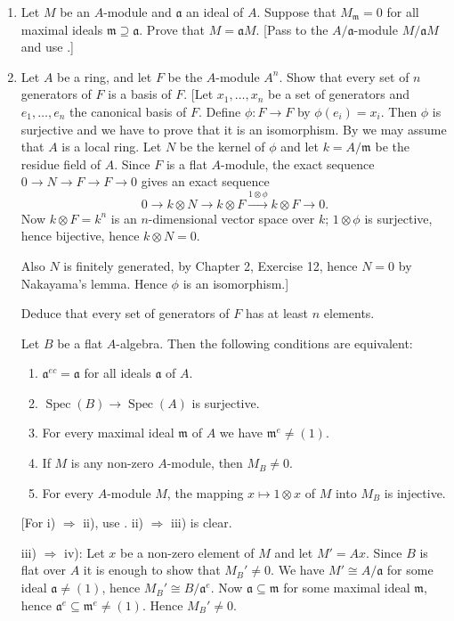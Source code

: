 \begin{enumerate}
\item Let $M$ be an $A$-module and $\mathfrak a$ an ideal of $A$. Suppose that $M_{\mathfrak m}=0$ for all maximal ideals $\mathfrak m\supseteq\mathfrak a$. Prove that $M=\mathfrak aM$. [Pass to the $A/\mathfrak a$-module $M/\mathfrak aM$ and use .]

\item Let $A$ be a ring, and let $F$ be the $A$-module $A^n$. Show that every set of $n$ generators of $F$ is a basis of $F$. [Let $x_1,\ldots,x_n$ be a set of generators and $e_1,\ldots,e_n$ the canonical basis of $F$. Define $\phi:F\longrightarrow F$ by $\phi(e_i)=x_i$. Then $\phi$ is surjective and we have to prove that it is an isomorphism. By  we may assume that $A$ is a local ring. Let $N$ be the kernel of $\phi$ and let $k=A/\mathfrak m$ be the residue field of $A$. Since $F$ is a flat $A$-module, the exact sequence $0\longrightarrow N\longrightarrow F\longrightarrow F\longrightarrow0$ gives an exact sequence
\[
 0\longrightarrow k\otimes N\longrightarrow k\otimes F\xrightarrow{1\otimes\phi}k\otimes F\longrightarrow0.
\]
Now $k\otimes F=k^n$ is an $n$-dimensional vector space over $k$; $1\otimes\phi$ is surjective, hence bijective, hence $k\otimes N=0$.

Also $N$ is finitely generated, by Chapter 2, Exercise 12, hence $N=0$ by Nakayama's lemma. Hence $\phi$ is an isomorphism.]

Deduce that every set of generators of $F$ has at least $n$ elements.

\amstaritem Let $B$ be a flat $A$-algebra. Then the following conditions are equivalent:
\begin{enumerate}
\renewcommand{\labelenumii}{\roman{enumii})}
\item $\mathfrak a^{ec}=\mathfrak a$ for all ideals $\mathfrak a$ of $A$.
\item $\operatorname{Spec}(B)\longrightarrow\operatorname{Spec}(A)$ is surjective.
\item For every maximal ideal $\mathfrak m$ of $A$ we have $\mathfrak m^e\neq(1)$.
\item If $M$ is any non-zero $A$-module, then $M_B\neq0$.
\item For every $A$-module $M$, the mapping $x\mapsto1\otimes x$ of $M$ into $M_B$ is injective.
\end{enumerate}
[For i) $\Rightarrow$ ii), use . ii) $\Rightarrow$ iii) is clear.

iii) $\Rightarrow$ iv): Let $x$ be a non-zero element of $M$ and let $M'=Ax$. Since $B$ is flat over $A$ it is enough to show that $M_B'\neq0$. We have $M'\cong A/\mathfrak a$ for some ideal $\mathfrak a\neq(1)$, hence $M_B'\cong B/\mathfrak a^e$. Now $\mathfrak a\subseteq\mathfrak m$ for some maximal ideal $\mathfrak m$, hence $\mathfrak a^e\subseteq\mathfrak m^e\neq(1)$. Hence $M_B'\neq0$.


\end{enumerate}
